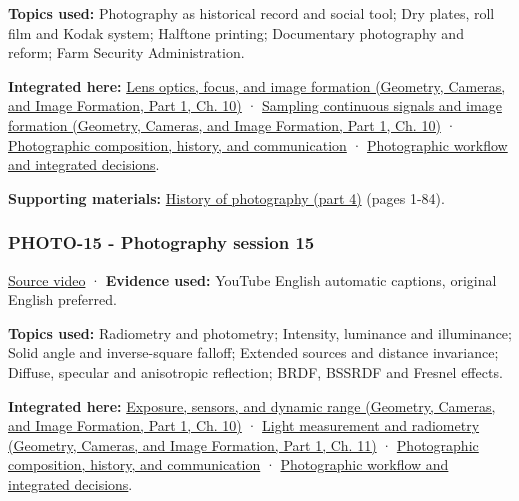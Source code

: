 \textbf{Topics used:} Photography as historical record and social tool; Dry plates, roll film and Kodak system; Halftone printing; Documentary photography and reform; Farm Security Administration.

\textbf{Integrated here:} \href{../03-Geometry-Cameras-and-Image-Formation-P01/main.pdf\#nameddest=03-visual-computing-i-ch003-lens-optics-focus-and-image-formation}{Lens optics, focus, and image formation (Geometry, Cameras, and Image Formation, Part 1, Ch. 10)} · \href{../03-Geometry-Cameras-and-Image-Formation-P01/main.pdf\#nameddest=03-visual-computing-i-ch003-sampling-continuous-signals-and-image-formation}{Sampling continuous signals and image formation (Geometry, Cameras, and Image Formation, Part 1, Ch. 10)} · \hyperref[04-visual-computing-ii-ch034-photographic-composition-history-and-communication]{Photographic composition, history, and communication} · \hyperref[04-visual-computing-ii-ch034-photographic-workflow-and-integrated-decisions]{Photographic workflow and integrated decisions}.

\textbf{Supporting materials:} \href{https://drive.google.com/open?id=0B6w2XfPHEcZYTjRoLWhnSUFEYTQ}{History of photography (part 4)} (pages 1-84).

\subsubsection{PHOTO-15 - Photography session 15}\label{04-visual-computing-ii-ch036-photo-15---photography-session-15}

\hypertarget{04-visual-computing-ii-ch036-photo-15---photography-session-15}{}

\href{https://www.youtube.com/watch?v=kO68jM_1eho}{Source video} · \textbf{Evidence used:} YouTube English automatic captions, original English preferred.

\textbf{Topics used:} Radiometry and photometry; Intensity, luminance and illuminance; Solid angle and inverse-square falloff; Extended sources and distance invariance; Diffuse, specular and anisotropic reflection; BRDF, BSSRDF and Fresnel effects.

\textbf{Integrated here:} \href{../03-Geometry-Cameras-and-Image-Formation-P01/main.pdf\#nameddest=03-visual-computing-i-ch003-exposure-sensors-and-dynamic-range}{Exposure, sensors, and dynamic range (Geometry, Cameras, and Image Formation, Part 1, Ch. 10)} · \href{../03-Geometry-Cameras-and-Image-Formation-P01/main.pdf\#nameddest=03-visual-computing-i-ch004-light-measurement-and-radiometry}{Light measurement and radiometry (Geometry, Cameras, and Image Formation, Part 1, Ch. 11)} · \hyperref[04-visual-computing-ii-ch034-photographic-composition-history-and-communication]{Photographic composition, history, and communication} · \hyperref[04-visual-computing-ii-ch034-photographic-workflow-and-integrated-decisions]{Photographic workflow and integrated decisions}.

